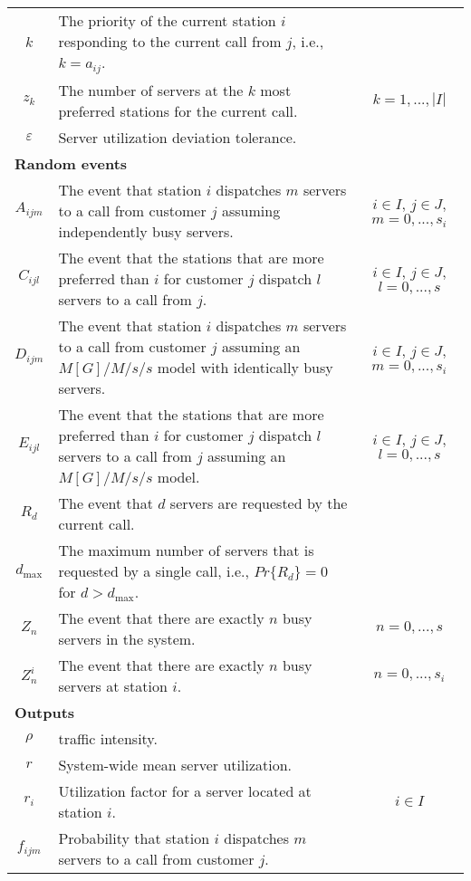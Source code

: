 \documentclass[11pt]{article}\topmargin 0mm
\begin{document}
\begin{table}
{\begin{tabular}{c p{3.8in} c}
$k$ & The priority of the current station $i$ responding to the current call from $j$, i.e., $k=a_{ij}$. & \\
$z_k$ & The number of servers at the $k$ most preferred stations for the current call. & $k=1,...,|I|$\\
$\varepsilon$ & Server utilization deviation tolerance. & \\
\multicolumn{3}{l}{\textbf{Random events} } \\
$A_{ijm}$ & The event that station $i$ dispatches $m$ servers to a call from customer $j$ assuming independently busy servers. & $i\in I$, $j\in J$, $m=0,...,s_i$ \\
$C_{ijl}$ & The event that the stations that are  more preferred than $i$ for customer $j$ dispatch $l$ servers to a call from $j$. & $i\in I$, $j\in J$, $l=0,...,s$\\
$D_{ijm}$ & The event that station $i$ dispatches $m$ servers to a call from customer $j$ assuming an $M[G]/M/s/s$ model with identically busy servers. & $i\in I$, $j\in J$, $m=0,...,s_i$\\
$E_{ijl}$ & The event that the stations that are more preferred than $i$ for customer $j$ dispatch $l$ servers to a call from $j$ assuming an $M[G]/M/s/s$ model. & $i\in I$, $j\in J$, $l=0,...,s$\\
$R_d$ & The event that $d$ servers are requested by the current call. & \\
$d_{\max}$ & The maximum number of servers that is requested by a single call, i.e., $Pr\{R_d\}=0$ for $d>d_{\max}$. & \\
$Z_n$ & The event that there are exactly $n$ busy servers in the system. & $n=0,...,s$\\
$Z_n^i$ & The event that there are exactly $n$ busy servers at station $i$. & $n=0,...,s_i$\\
\multicolumn{3}{l}{\textbf{Outputs} }\\
$\rho$ & traffic intensity. & \\
$r$ & System-wide mean server utilization. & \\
$r_i$ & Utilization factor for a server located at station $i$. & $i\in I$ \\
$f_{ijm}$ & Probability that station $i$ dispatches $m$ servers to a call from customer $j$.\\

\end{tabular}}
\end{table}
\end{document}
